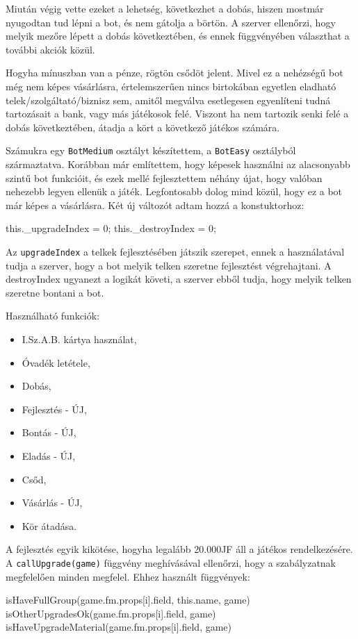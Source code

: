 Miután végig vette ezeket a lehetség, következhet a dobás, hiszen mostmár nyugodtan tud lépni a bot, és nem gátolja a börtön. A szerver ellenőrzi, hogy melyik mezőre lépett a dobás következtében, és ennek függvényében választhat a további akciók közül.

Hogyha mínuszban van a pénze, rögtön csődöt jelent. Mivel ez a nehézségű bot még nem képes vásárlásra, értelemszerűen nincs birtokában egyetlen eladható  telek/szolgáltató/biznisz sem, amitől megválva esetlegesen egyenlíteni tudná tartozásait a bank, vagy más játékosok felé. Viszont ha nem tartozik senki felé a dobás következtében, átadja a kört a következő játékos számára. 


Számukra egy \texttt{BotMedium} osztályt készítettem, a \texttt{BotEasy} osztályból származtatva. Korábban már említettem, hogy képesek használni az alacsonyabb szintű bot funkcióit, és ezek mellé fejlesztettem néhány újat, hogy valóban nehezebb legyen ellenük a játék. Legfontosabb dolog mind közül, hogy ez a bot már képes a vásárlásra. Két új változót adtam hozzá a konstuktorhoz:
\begin{javascript}
  this._upgradeIndex = 0;
  this._destroyIndex = 0;
\end{javascript}

Az \texttt{upgradeIndex} a telkek fejlesztésében játszik szerepet, ennek a használatával tudja a szerver, hogy a bot melyik telken szeretne fejlesztést végrehajtani. A destroyIndex ugyanezt a logikát követi, a szerver ebből tudja, hogy melyik telken szeretne bontani a bot.

Használható funkciók:
\begin{itemize}
\item I.Sz.A.B. kártya használat,
\item Óvadék letétele,
\item Dobás,
\item Fejlesztés - ÚJ,
\item Bontás - ÚJ,
\item Eladás - ÚJ,
\item Csőd,
\item Vásárlás - ÚJ,
\item Kör átadása.
\end{itemize}

A fejlesztés egyik kikötése, hogyha legalább 20.000JF áll a játékos rendelkezésére. A \texttt{callUpgrade(game)} függvény meghívásával ellenőrzi, hogy a szabályzatnak megfelelően minden megfelel. Ehhez használt függvények:
\begin{javascript}
isHaveFullGroup(game.fm.props[i].field, this.name, game)
isOtherUpgradesOk(game.fm.props[i].field, game)
isHaveUpgradeMaterial(game.fm.props[i].field, game)
\end{javascript}

